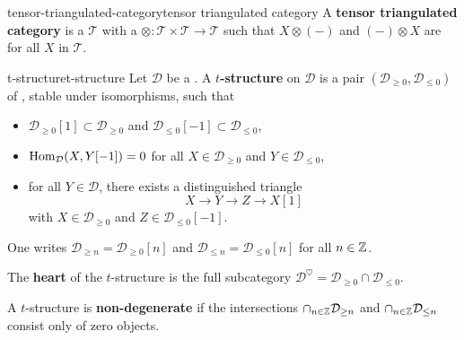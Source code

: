 \begin{topic}{tensor-triangulated-category}{tensor triangulated category}
    A \textbf{tensor triangulated category} is a  $\mathcal{T}$ with a  $\otimes : \mathcal{T} \times \mathcal{T} \to \mathcal{T}$ such that $X \otimes (-)$ and $(-) \otimes X$ are  for all $X$ in $\mathcal{T}$.
\end{topic}

\begin{topic}{t-structure}{t-structure}
    Let $\mathcal{D}$ be a . A \textbf{$t$-structure} on $\mathcal{D}$ is a pair $(\mathcal{D}_{\ge 0}, \mathcal{D}_{\le 0})$ of , stable under isomorphisms, such that
    \begin{itemize}
        \item $\mathcal{D}_{\ge 0}[1] \subset \mathcal{D}_{\ge 0}$ and $\mathcal{D}_{\le 0}[-1] \subset \mathcal{D}_{\le 0}$,
        \item $\operatorname{Hom}_\mathcal{D}(X, Y[-1]) = 0$ for all $X \in \mathcal{D}_{\ge 0}$ and $Y \in \mathcal{D}_{\le 0}$,
        \item for all $Y \in \mathcal{D}$, there exists a distinguished triangle
        \[ X \to Y \to Z \to X[1] \]
        with $X \in \mathcal{D}_{\ge 0}$ and $Z \in \mathcal{D}_{\le 0}[-1]$.
    \end{itemize}
    One writes $\mathcal{D}_{\ge n} = \mathcal{D}_{\ge 0}[n]$ and $\mathcal{D}_{\le n} = \mathcal{D}_{\le 0}[n]$ for all $n \in \mathbb{Z}$.
    
    The \textbf{heart} of the $t$-structure is the full subcategory $\mathcal{D}^\heartsuit = \mathcal{D}_{\ge 0} \cap \mathcal{D}_{\le 0}$.
    
    A $t$-structure is \textbf{non-degenerate} if the intersections $\cap_{n \in \mathbb{Z}} \mathcal{D}_{\ge n}$ and $\cap_{n \in \mathbb{Z}} \mathcal{D}_{\le n}$ consist only of zero objects.
\end{topic}

